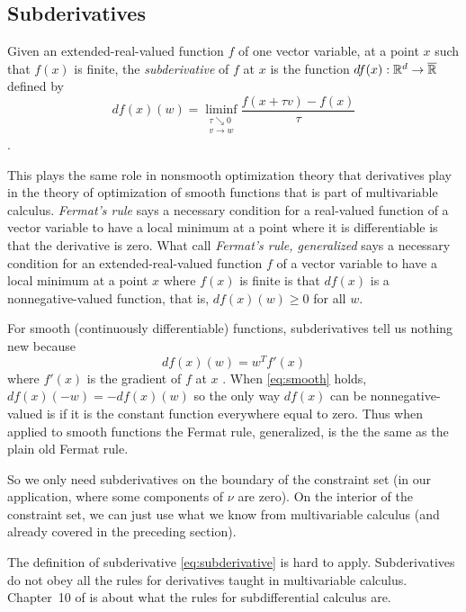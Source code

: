 \subsection{Subderivatives}
\label{sec:subderivatives}

Given an extended-real-valued function $f$ of one vector variable,
at a point $x$ such that $f(x)$ is finite,
the \emph{subderivative} of $f$ at $x$ is
the function $d f(x) : \mathbb{R}^d \to \overline{\mathbb{R}}$ defined by
\begin{equation} \label{eq:subderivative}
   d f(x)(w) = \liminf_{\substack{\tau \searrow 0 \\ v \to w}}
   \frac{f(x + \tau v) - f(x)}{\tau}
\end{equation}
\citep[Definition~8.1]{rockafellar-wets}.

This plays the same role in nonsmooth optimization theory
that derivatives play in the theory of optimization of smooth functions that
is part of multivariable calculus.  \emph{Fermat's rule} says a necessary
condition for a real-valued function of a vector variable to have
a local minimum at a point where it is differentiable is that
the derivative is zero.  What \citet[Theorem~10.1]{rockafellar-wets} call
\emph{Fermat's rule, generalized} says a necessary condition for
an extended-real-valued function $f$ of a vector variable to have
a local minimum at a point $x$ where $f(x)$ is finite is that $d f(x)$ is
a nonnegative-valued function, that is, $d f(x)(w) \ge 0$ for all $w$.

For smooth (continuously differentiable) functions,
subderivatives tell us nothing new because
\begin{equation} \label{eq:smooth}
   d f(x)(w) = w^T f'(x)
\end{equation}
where $f'(x)$ is the gradient of $f$ at $x$
\citep[Exercise~8.20]{rockafellar-wets}.
When \eqref{eq:smooth} holds, $d f(x)(- w) = - d f(x)(w)$ so the only way
$d f(x)$ can be nonnegative-valued is if it is the constant function everywhere
equal to zero.  Thus when applied to smooth functions the Fermat rule,
generalized, is the the same as the plain old Fermat rule.

So we only need subderivatives
on the boundary of the constraint set (in our application,
where some components of $\nu$ are
zero).  On the interior of the constraint set, we can just use what we know
from multivariable calculus (and already covered in the preceding section).

The definition of subderivative \eqref{eq:subderivative} is hard to apply.
Subderivatives do not obey all the rules for derivatives taught
in multivariable calculus.  Chapter~10 of \citet{rockafellar-wets}
is about what the rules for subdifferential calculus are.

